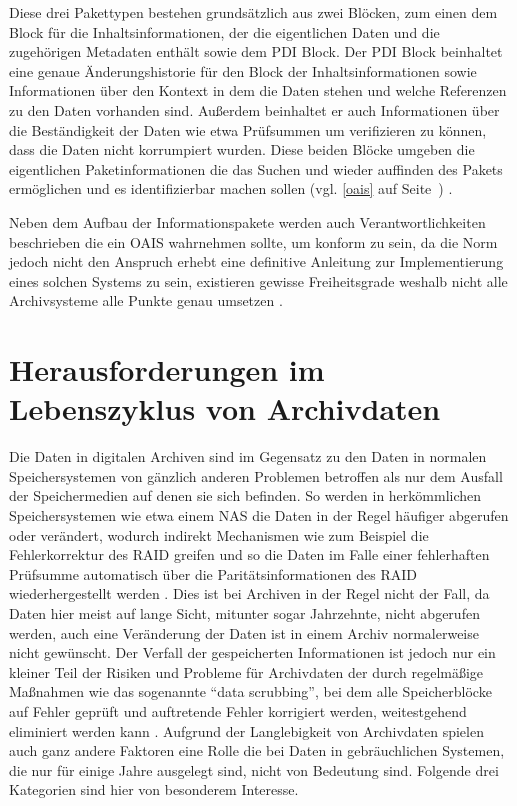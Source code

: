 \documentclass[conference,compsoc,final,a4paper]{IEEEtran}
\begin{document}
Diese drei Pakettypen bestehen grundsätzlich aus zwei Blöcken, zum einen dem Block für die Inhaltsinformationen, der die eigentlichen Daten und die zugehörigen Metadaten enthält sowie dem \ac{PDI} Block. Der \ac{PDI} Block beinhaltet eine genaue Änderungshistorie für den Block der Inhaltsinformationen sowie Informationen über den Kontext in dem die Daten stehen und welche Referenzen zu den Daten vorhanden sind. Außerdem beinhaltet er auch Informationen über die Beständigkeit der Daten wie etwa Prüfsummen um verifizieren zu können, dass die Daten nicht korrumpiert wurden. Diese beiden Blöcke umgeben die eigentlichen Paketinformationen die das Suchen und wieder auffinden des Pakets ermöglichen und es identifizierbar machen sollen (vgl. \autoref{oais} auf Seite~\pageref{oais}) \autocite{Ball2006}.

Neben dem Aufbau der Informationspakete werden auch Verantwortlichkeiten beschrieben die ein \ac{OAIS} wahrnehmen sollte, um konform zu sein, da die Norm jedoch nicht den Anspruch erhebt eine definitive Anleitung zur Implementierung eines solchen Systems zu sein, existieren gewisse Freiheitsgrade weshalb nicht alle Archivsysteme alle Punkte genau umsetzen \autocite{Ball2006}.

\section{Herausforderungen im Lebenszyklus von Archivdaten}
Die Daten in digitalen Archiven sind im Gegensatz zu den Daten in normalen Speichersystemen von gänzlich anderen Problemen betroffen als nur dem Ausfall der Speichermedien auf denen sie sich befinden. So werden in herkömmlichen Speichersystemen wie etwa einem \ac{NAS} die Daten in der Regel häufiger abgerufen oder verändert, wodurch indirekt Mechanismen wie zum Beispiel die Fehlerkorrektur des \ac{RAID} greifen und so die Daten im Falle einer fehlerhaften Prüfsumme automatisch über die Paritätsinformationen des \ac{RAID} wiederhergestellt werden \autocite{Lakshmi2008}. Dies ist bei Archiven in der Regel nicht der Fall, da Daten hier meist auf lange Sicht, mitunter sogar Jahrzehnte, nicht abgerufen werden, auch eine Veränderung der Daten ist in einem Archiv normalerweise nicht gewünscht. Der Verfall der gespeicherten Informationen ist jedoch nur ein kleiner Teil der Risiken und Probleme für Archivdaten der durch regelmäßige Maßnahmen wie das sogenannte ``data scrubbing'', bei dem alle Speicherblöcke auf Fehler geprüft und auftretende Fehler korrigiert werden, weitestgehend eliminiert werden kann \autocite{Lakshmi2008}. Aufgrund der Langlebigkeit von Archivdaten spielen auch ganz andere Faktoren eine Rolle die bei Daten in gebräuchlichen Systemen, die nur für einige Jahre ausgelegt sind, nicht von Bedeutung sind. Folgende drei Kategorien sind hier von besonderem Interesse.
\end{document}
